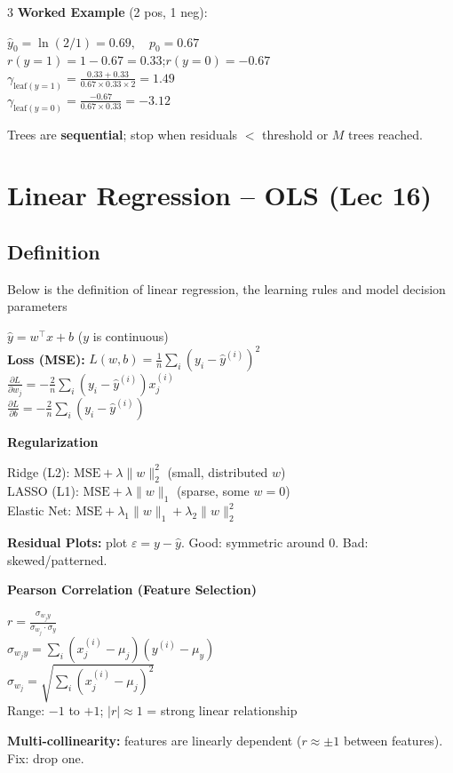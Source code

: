 \documentclass[8pt,letterpaper]{extarticle}
\begin{document}
\begin{multicols}{3}
\textbf{Worked Example} (2 pos, 1 neg):
\begin{formulabox}
$\hat{y}_0 = \ln(2/1) = 0.69,\quad p_0 = 0.67$\\
$r(y=1) = 1-0.67 = 0.33$;\quad $r(y=0) = -0.67$\\
$\gamma_{\text{leaf}(y=1)} = \frac{0.33+0.33}{0.67{\times}0.33{\times}2} = 1.49$\\
$\gamma_{\text{leaf}(y=0)} = \frac{-0.67}{0.67{\times}0.33} = -3.12$
\end{formulabox}
Trees are \textbf{sequential}; stop when residuals $<$ threshold or $M$ trees reached.

\section{Linear Regression -- OLS (Lec 16)}

\subsection{Definition}
Below is the definition of linear regression, the learning rules and model decision parameters

\begin{formulabox}
$\hat{y} = w^\top x + b$ \quad ($y$ is continuous)\\[2pt]
\textbf{Loss (MSE):} $L(w,b) = \frac{1}{n}\sum_i (y_i - \hat{y}^{(i)})^2$\\[2pt]
$\frac{\partial L}{\partial w_j} = -\frac{2}{n}\sum_i(y_i-\hat{y}^{(i)})x_j^{(i)}$\\
$\frac{\partial L}{\partial b} = -\frac{2}{n}\sum_i(y_i-\hat{y}^{(i)})$
\end{formulabox}

\textbf{Regularization}
\begin{formulabox}
Ridge (L2): $\text{MSE} + \lambda\|w\|_2^2$ \quad (small, distributed $w$)\\
LASSO (L1): $\text{MSE} + \lambda\|w\|_1$ \quad (sparse, some $w=0$)\\
Elastic Net: $\text{MSE} + \lambda_1\|w\|_1 + \lambda_2\|w\|_2^2$
\end{formulabox}

\textbf{Residual Plots:} plot $\varepsilon = y - \hat{y}$. Good: symmetric around 0. Bad: skewed/patterned.

\textbf{Pearson Correlation (Feature Selection)}
\begin{formulabox}
$r = \frac{\sigma_{w_j y}}{\sigma_{w_j}\cdot\sigma_y}$\\
$\sigma_{w_j y} = \sum_i(x_j^{(i)}-\mu_j)(y^{(i)}-\mu_y)$\\
$\sigma_{w_j} = \sqrt{\sum_i(x_j^{(i)}-\mu_j)^2}$\\
Range: $-1$ to $+1$;\; $|r|\approx 1$ = strong linear relationship
\end{formulabox}
\textbf{Multi-collinearity:} features are linearly dependent ($r \approx \pm 1$ between features). Fix: drop one.


\end{multicols}
\end{document}
